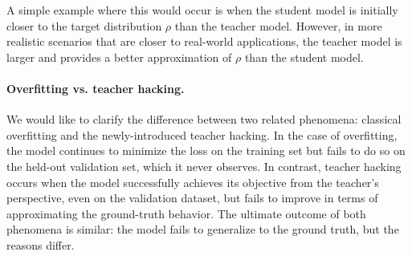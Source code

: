 A simple example where this would occur is when the student model is initially closer to the target distribution $\rho$ than the teacher model. However, in more realistic scenarios that are closer to real-world applications, the teacher model is larger and provides a better approximation of $\rho$ than the student model.

\paragraph{Overfitting vs. teacher hacking.} 

We would like to clarify the difference between two related phenomena: classical overfitting and the newly-introduced teacher hacking. In the case of overfitting, the model continues to minimize the loss on the training set but fails to do so on the held-out validation set, which it never observes. In contrast, teacher hacking occurs when the model successfully achieves its objective from the teacher's perspective, even on the validation dataset, but fails to improve in terms of approximating the ground-truth behavior. The ultimate outcome of both phenomena is similar: the model fails to generalize to the ground truth, but the reasons differ.
